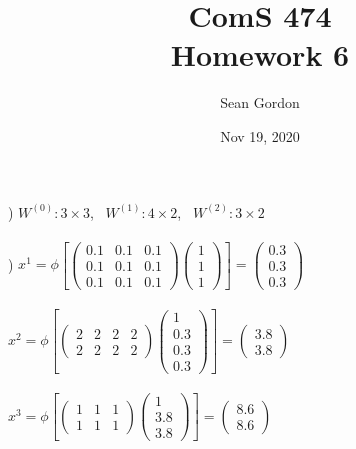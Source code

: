 \documentclass[12pt]{article}
\title{ComS 474\\Homework 6}
\author{Sean Gordon}
\date{Nov 19, 2020}
\begin{document}
\maketitle



) $W^{(0)}: 3\times3$, \ $W^{(1)}: 4\times2$, \ $W^{(2)}: 3\times2$\\



\noindent \hrulefill \\



) $x^1 = \phi\left[
\begin{pmatrix}
0.1 & 0.1 & 0.1\\
0.1 & 0.1 & 0.1\\
0.1 & 0.1 & 0.1
\end{pmatrix}
\begin{pmatrix}
1\\ 1\\ 1
\end{pmatrix}\right]=
\begin{pmatrix}
0.3\\ 0.3\\ 0.3
\end{pmatrix}$\\\\

\indent $x^2 = \phi\left[
\begin{pmatrix}
2 & 2 & 2 & 2\\
2 & 2 & 2 & 2
\end{pmatrix}
\begin{pmatrix}
1\\ 0.3\\ 0.3 \\ 0.3
\end{pmatrix}\right]=
\begin{pmatrix}
3.8\\ 3.8
\end{pmatrix}$\\\\

\indent $x^3 = \phi\left[
\begin{pmatrix}
1 & 1 & 1\\
1 & 1 & 1
\end{pmatrix}
\begin{pmatrix}
1\\ 3.8\\ 3.8
\end{pmatrix}\right]=
\begin{pmatrix}
8.6 \\ 8.6
\end{pmatrix}$\\\\
\end{document}
